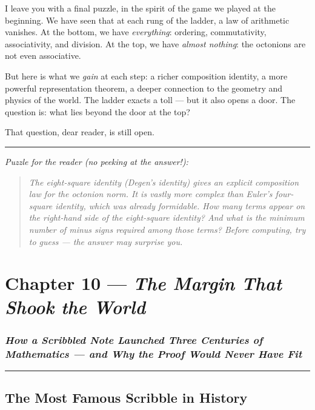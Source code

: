 \documentclass[12pt, letterpaper, openany]{book}
\theoremstyle{definition}
\theoremstyle{remark}
\begin{document}
I leave you with a final puzzle, in the spirit of the game we played at the beginning. We have seen that at each rung of the ladder, a law of arithmetic vanishes. At the bottom, we have \textit{everything}: ordering, commutativity, associativity, and division. At the top, we have \textit{almost nothing}: the octonions are not even associative.

But here is what we \textit{gain} at each step: a richer composition identity, a more powerful representation theorem, a deeper connection to the geometry and physics of the world. The ladder exacts a toll --- but it also opens a door. The question is: what lies beyond the door at the top?

That question, dear reader, is still open.


\bigskip\noindent\rule{\textwidth}{0.4pt}\bigskip


\textit{Puzzle for the reader (no peeking at the answer!):}


\begin{quote}
\textit{The eight-square identity (Degen's identity) gives an explicit composition law for the octonion norm. It is vastly more complex than Euler's four-square identity, which was already formidable. How many terms appear on the right-hand side of the eight-square identity? And what is the minimum number of minus signs required among those terms? Before computing, try to guess --- the answer may surprise you.}
\end{quote}



\clearpage

\chapter{Chapter 10 --- \textit{The Margin That Shook the World}}



\subsection*{\textit{How a Scribbled Note Launched Three Centuries of Mathematics --- and Why the Proof Would Never Have Fit}}



\bigskip\noindent\rule{\textwidth}{0.4pt}\bigskip



\section*{The Most Famous Scribble in History}
\end{document}
